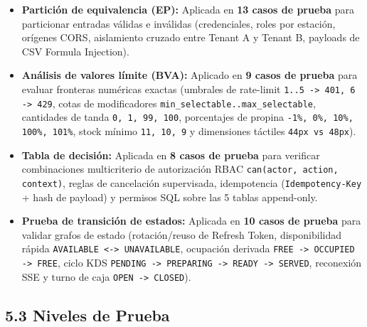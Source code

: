 \documentclass[10pt,a4paper]{article}
\providecommand{\tightlist}{\setlength{\itemsep}{0pt}\setlength{\parskip}{0pt}}
\begin{document}
\begin{itemize}
\tightlist
\item
  \textbf{Partición de equivalencia (EP):} Aplicada en \textbf{13 casos de prueba} para particionar entradas válidas e inválidas (credenciales, roles por estación, orígenes CORS, aislamiento cruzado entre Tenant A y Tenant B, payloads de CSV Formula Injection).
\item
  \textbf{Análisis de valores límite (BVA):} Aplicado en \textbf{9 casos de prueba} para evaluar fronteras numéricas exactas (umbrales de rate-limit \texttt{1.\allowbreak{}.\allowbreak{}5 -{}\allowbreak{}\textgreater{} 401,\allowbreak{} 6 -{}\allowbreak{}\textgreater{} 429}, cotas de modificadores \texttt{min\_\allowbreak{}selectable.\allowbreak{}.\allowbreak{}max\_\allowbreak{}selectable}, cantidades de tanda \texttt{0,\allowbreak{} 1,\allowbreak{} 99,\allowbreak{} 100}, porcentajes de propina \texttt{-{}\allowbreak{}1\%,\allowbreak{} 0\%,\allowbreak{} 10\%,\allowbreak{} 100\%,\allowbreak{} 101\%}, stock mínimo \texttt{11,\allowbreak{} 10,\allowbreak{} 9} y dimensiones táctiles \texttt{44px vs 48px}).
\item
  \textbf{Tabla de decisión:} Aplicada en \textbf{8 casos de prueba} para verificar combinaciones multicriterio de autorización RBAC \texttt{can(\allowbreak{}actor,\allowbreak{} action,\allowbreak{} context)\allowbreak{}}, reglas de cancelación supervisada, idempotencia (\texttt{Idempotency-{}\allowbreak{}Key} + hash de payload) y permisos SQL sobre las 5 tablas append-only.
\item
  \textbf{Prueba de transición de estados:} Aplicada en \textbf{10 casos de prueba} para validar grafos de estado (rotación/reuso de Refresh Token, disponibilidad rápida \texttt{AVAILABLE \textless{}-{}\allowbreak{}\textgreater{} UNAVAILABLE}, ocupación derivada \texttt{FREE -{}\allowbreak{}\textgreater{} OCCUPIED -{}\allowbreak{}\textgreater{} FREE}, ciclo KDS \texttt{PENDING -{}\allowbreak{}\textgreater{} PREPARING -{}\allowbreak{}\textgreater{} READY -{}\allowbreak{}\textgreater{} SERVED}, reconexión SSE y turno de caja \texttt{OPEN -{}\allowbreak{}\textgreater{} CLOSED}).
\end{itemize}


\subsection{5.3 Niveles de Prueba}\label{53-niveles-de-prueba}
\end{document}
